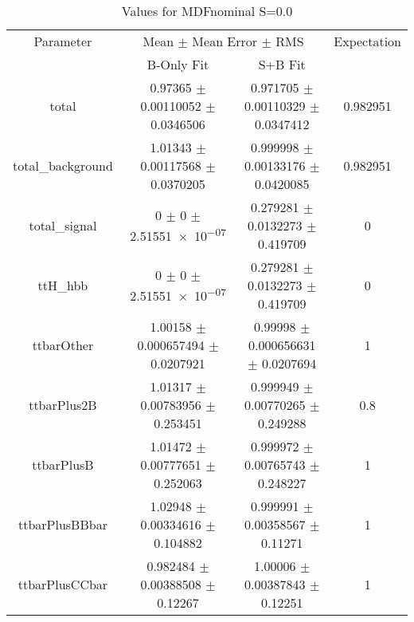 \begin{table}
\centering
\caption{Values for MDFnominal S=0.0}
\begin{tabular}{cccc}
\toprule
Parameter & \multicolumn{2}{c}{Mean $\pm$ Mean Error $\pm$ RMS} & Expectation\\
 & B-Only Fit & S+B Fit & \\
\midrule
total & \num{0.97365} $\pm$ \num{0.00110052} $\pm$ \num{0.0346506} & \num{0.971705} $\pm$ \num{0.00110329} $\pm$ \num{0.0347412} & \num{0.982951}\\
total\_background & \num{1.01343} $\pm$ \num{0.00117568} $\pm$ \num{0.0370205} & \num{0.999998} $\pm$ \num{0.00133176} $\pm$ \num{0.0420085} & \num{0.982951}\\
total\_signal & \num{0} $\pm$ \num{0} $\pm$ \num{2.51551e-07} & \num{0.279281} $\pm$ \num{0.0132273} $\pm$ \num{0.419709} & \num{0}\\
ttH\_hbb & \num{0} $\pm$ \num{0} $\pm$ \num{2.51551e-07} & \num{0.279281} $\pm$ \num{0.0132273} $\pm$ \num{0.419709} & \num{0}\\
ttbarOther & \num{1.00158} $\pm$ \num{0.000657494} $\pm$ \num{0.0207921} & \num{0.99998} $\pm$ \num{0.000656631} $\pm$ \num{0.0207694} & \num{1}\\
ttbarPlus2B & \num{1.01317} $\pm$ \num{0.00783956} $\pm$ \num{0.253451} & \num{0.999949} $\pm$ \num{0.00770265} $\pm$ \num{0.249288} & \num{0.8}\\
ttbarPlusB & \num{1.01472} $\pm$ \num{0.00777651} $\pm$ \num{0.252063} & \num{0.999972} $\pm$ \num{0.00765743} $\pm$ \num{0.248227} & \num{1}\\
ttbarPlusBBbar & \num{1.02948} $\pm$ \num{0.00334616} $\pm$ \num{0.104882} & \num{0.999991} $\pm$ \num{0.00358567} $\pm$ \num{0.11271} & \num{1}\\
ttbarPlusCCbar & \num{0.982484} $\pm$ \num{0.00388508} $\pm$ \num{0.12267} & \num{1.00006} $\pm$ \num{0.00387843} $\pm$ \num{0.12251} & \num{1}\\
\bottomrule
\end{tabular}
\end{table}